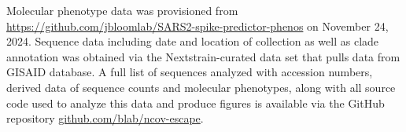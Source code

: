 Molecular phenotype data was provisioned from \href{https://github.com/jbloomlab/SARS2-spike-predictor-phenos}{https://github.com/jbloomlab/SARS2-spike-predictor-phenos} on November 24, 2024.
Sequence data including date and location of collection as well as clade annotation was obtained via the Nextstrain-curated data set that pulls data from GISAID database.
A full list of sequences analyzed with accession numbers, derived data of sequence counts and molecular phenotypes, along with all source code used to analyze this data and produce figures is available via the GitHub repository \href{https://github.com/blab/ncov-escape}{github.com/blab/ncov-escape}.
